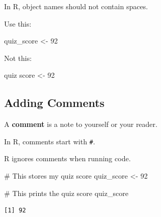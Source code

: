 \documentclass[
  letterpaper,
  DIV=11,
  numbers=noendperiod]{scrartcl}
\newenvironment{Shaded}{\begin{snugshade}}{\end{snugshade}}
\newcommand{\CommentTok}[1]{\textcolor[rgb]{0.37,0.37,0.37}{#1}}
\newcommand{\DecValTok}[1]{\textcolor[rgb]{0.68,0.00,0.00}{#1}}
\newcommand{\NormalTok}[1]{\textcolor[rgb]{0.00,0.23,0.31}{#1}}
\newcommand{\OtherTok}[1]{\textcolor[rgb]{0.00,0.23,0.31}{#1}}
\begin{document}
\begin{tcolorbox}[enhanced jigsaw, arc=.35mm, bottomrule=.15mm, bottomtitle=1mm, breakable, colback=white, colbacktitle=quarto-callout-tip-color!10!white, colframe=quarto-callout-tip-color-frame, coltitle=black, left=2mm, leftrule=.75mm, opacityback=0, opacitybacktitle=0.6, rightrule=.15mm, title=\textcolor{quarto-callout-tip-color}{\faLightbulb}\hspace{0.5em}{Tip}, titlerule=0mm, toprule=.15mm, toptitle=1mm]

In R, object names should not contain spaces.

Use this:

\begin{Shaded}
\begin{Highlighting}[]
\NormalTok{quiz\_score }\OtherTok{\textless{}{-}} \DecValTok{92}
\end{Highlighting}
\end{Shaded}

Not this:

\begin{Shaded}
\begin{Highlighting}[]
\NormalTok{quiz score }\OtherTok{\textless{}{-}} \DecValTok{92}
\end{Highlighting}
\end{Shaded}

\end{tcolorbox}

\subsection{Adding Comments}\label{adding-comments}

A \textbf{comment} is a note to yourself or your reader.

In R, comments start with \texttt{\#}.

R ignores comments when running code.

\begin{Shaded}
\begin{Highlighting}[]
\CommentTok{\# This stores my quiz score}
\NormalTok{quiz\_score }\OtherTok{\textless{}{-}} \DecValTok{92}

\CommentTok{\# This prints the quiz score}
\NormalTok{quiz\_score}
\end{Highlighting}
\end{Shaded}

\begin{verbatim}
[1] 92
\end{verbatim}
\end{document}
